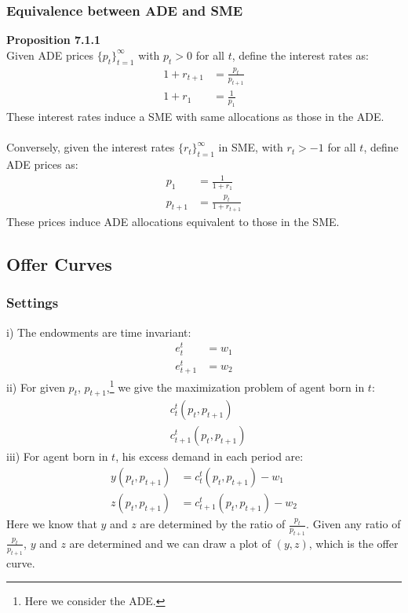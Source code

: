 \documentclass{article}
\begin{document}
\subsubsection{Equivalence between ADE and SME}
\textbf{Proposition 7.1.1}\\
Given ADE prices $\{p_t\}^\infty_{t=1}$ with $p_t > 0$ for all $t$, define the interest rates as:
	\begin{align*}
		1 + r_{t+1} &= \frac{p_t}{p_{t+1}}\\
		1 + r_1 &= \frac{1}{p_1}
	\end{align*}
These interest rates induce a SME with same allocations as those in the ADE.\\\\
Conversely, given the interest rates $\{r_t\}^\infty_{t=1}$ in SME, with $r_t > -1$ for all $t$, define ADE prices as:
	\begin{align*}
		p_1 &= \frac{1}{1 + r_1}\\
		p_{t+1} &= \frac{p_t}{1 + r_{t+1}}
	\end{align*}
These prices induce ADE allocations equivalent to those in the SME.

\subsection{Offer Curves}
\subsubsection{Settings}
\indent i) The endowments are time invariant:
	\begin{align*}
		e^t_t &= w_1\\
		e^t_{t+1} &= w_2 
	\end{align*}
\indent ii) For given $p_t$, $p_{t+1}$,\footnote{Here we consider the ADE.} we give the maximization problem of agent born in $t$: 
	\begin{align*}
		&c^t_t(p_t, p_{t+1})\\
		&c^t_{t+1}(p_t, p_{t+1})
	\end{align*}
\indent iii) For agent born in $t$, his excess demand in each period are:
	\begin{align*}
		y(p_t, p_{t+1}) &= c^t_{t}(p_t, p_{t+1}) - w_1\\
		z(p_t, p_{t+1}) &= c^t_{t+1}(p_t, p_{t+1}) - w_2
	\end{align*}
Here we know that $y$ and $z$ are determined by the ratio of $\frac{p_t}{p_{t+1}}$. Given any ratio of $\frac{p_t}{p_{t+1}}$, $y$ and $z$ are determined and we can draw a plot of $(y, z)$, which is the offer curve.
\end{document}
